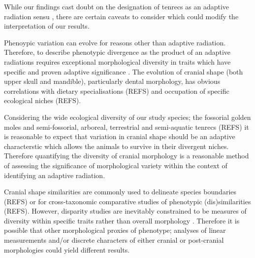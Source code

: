 \documentclass[12pt,a4paper]{article}
\begin{document}
 


While our findings cast doubt on the designation of tenrecs as an adaptive radiation sensu \citep{Losos2010a}, there are certain caveats to consider which could modify the interpretation of our results.

Phenoypic variation can evolve for reasons other than adaptive radiation. Therefore, to describe phenotypic divergence as the product of an adaptive radiations requires exceptional morphological diversity in traits which have specific and proven adaptive significance \citep{Losos2010a}. The evolution of cranial shape (both upper skull and mandible), particularly dental morphology, has obvious correlations with dietary specialisations (REFS) and occupation of specific ecological niches (REFS). 


Considering the wide ecological diversity of our study species; the fossorial golden moles and semi-fossorial, arboreal, terrestrial and semi-aquatic tenrecs (REFS) it is reasonable to expect that variation in cranial shape should be an adaptive characterstic which allows the animals to survive in their divergent niches. Therefore quantifying the diversity of cranial morphology is a reasonable method of assessing the significance of morphological variety within the context of identifying an adaptive radiation.

Cranial shape similarities are commonly used to delineate species boundaries (REFS) or for cross-taxonomic comparative studies of phenotypic (dis)similarities (REFS). However, disparity studies are inevitably constrained to be measures of diversity within specific traits rather than overall morphology \citep{Roy1997}. Therefore it is possible that other morphological proxies of phenotype; analyses of linear measurements and/or discrete characters of either cranial or post-cranial morphologies could yield different results. 
\end{document}
